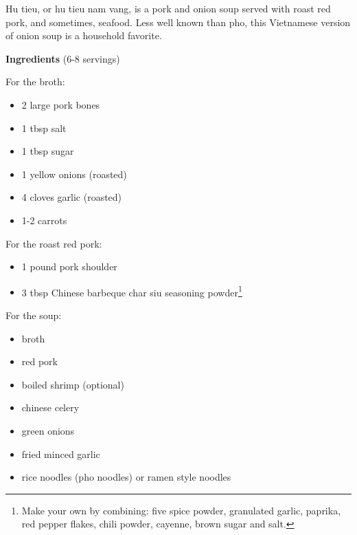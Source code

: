 \documentclass[
]{book}
\providecommand{\tightlist}{%
  \setlength{\itemsep}{0pt}\setlength{\parskip}{0pt}}
\begin{document}
Hu tieu, or hu tieu nam vang, is a pork and onion soup served with roast red pork, and sometimes, seafood. Less well known than pho, this Vietnamese version of onion soup is a household favorite.

\begin{blackbox}

\textbf{Ingredients} (6-8 servings)

For the broth:

\begin{itemize}
\tightlist
\item
  2 large pork bones
\item
  1 tbsp salt
\item
  1 tbsp sugar
\item
  1 yellow onions (roasted)
\item
  4 cloves garlic (roasted)
\item
  1-2 carrots
\end{itemize}

For the roast red pork:

\begin{itemize}
\tightlist
\item
  1 pound pork shoulder
\item
  3 tbsp Chinese barbeque char siu seasoning powder\footnote{Make your own by combining: five spice powder, granulated garlic, paprika, red pepper flakes, chili powder, cayenne, brown sugar and salt.}
\end{itemize}

For the soup:

\begin{itemize}
\tightlist
\item
  broth
\item
  red pork
\item
  boiled shrimp (optional)
\item
  chinese celery
\item
  green onions
\item
  fried minced garlic
\item
  rice noodles (pho noodles) or ramen style noodles
\end{itemize}

\end{blackbox}
\end{document}
